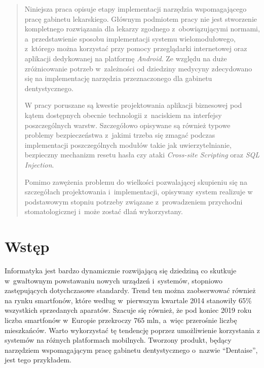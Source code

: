 \documentclass[11pt]{aghdpl}
\author{Mateusz Kulpa}
\date{2014}
\begin{document}
\titlepages

\begin{abstract}

Niniejsza praca opisuje etapy implementacji narzędzia wspomagającego pracę gabinetu lekarskiego. Głównym podmiotem pracy nie jest stworzenie kompletnego rozwiązania dla lekarzy zgodnego z~obowiązującymi normami, a~przedstawienie sposobu implementacji systemu wielomodułowego, z~którego można korzystać przy pomocy przeglądarki internetowej oraz aplikacji dedykowanej na platformę \emph{Android}. Ze względu na duże zróżnicowanie potrzeb w~zależności od dziedziny medycyny zdecydowano się na implementację narzędzia przeznaczonego dla gabinetu dentystycznego. 

W pracy poruszane są kwestie projektowania aplikacji biznesowej pod kątem dostępnych obecnie technologii z~naciskiem na interfejsy poszczególnych warstw. Szczegółowo opisywane są również typowe problemy bezpieczeństwa z~jakimi trzeba się zmagać podczas implementacji poszczególnych modułów takie jak uwierzytelnianie, bezpieczny mechanizm resetu hasła czy ataki \emph{Cross-site Scripting} oraz \emph{SQL Injection}.

Pomimo zawężenia problemu do wielkości pozwalającej skupieniu się na szczegółach projektowania i~implementacji, opisywany system realizuje w podstawowym stopniu potrzeby związane z~prowadzeniem przychodni stomatologicznej i~może zostać dlań wykorzystany.

\end{abstract}

\setcounter{tocdepth}{3}
\tableofcontents
\clearpage


\chapter{Wstęp}
\label{cha:wstep}

Informatyka jest bardzo dynamicznie rozwijającą się dziedziną co skutkuje w~gwałtownym powstawaniu nowych urządzeń i~systemów, stopniowo zastępujących dotychczasowe standardy. Trend ten można zaobserwować również na rynku smartfonów, które według \cite{MG} w~pierwszym kwartale 2014 stanowiły 65\% wszystkich sprzedanych aparatów. Szacuje się również, że pod koniec 2019 roku liczba smartfonów w~Europie przekroczy 765 mln, a~więc przerośnie liczbę mieszkańców. Warto wykorzystać tę tendencję poprzez umożliwienie korzystania z systemów na różnych platformach mobilnych. Tworzony produkt, będący narzędziem wspomagającym pracę gabinetu dentystycznego o~nazwie ``Dentaise'', jest tego przykładem.
\end{document}
